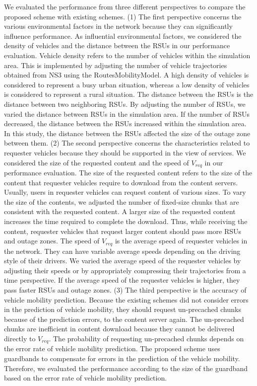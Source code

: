 \documentclass[electronics,aricle,accept,pdftex,moreauthors]{Definitions/mdpi}
\begin{document}
We evaluated the performance from three different perspectives to compare the proposed scheme with existing schemes. (1) The first perspective concerns the various environmental factors in the network because they can significantly influence performance. As influential environmental factors, we considered the density of vehicles and the distance between the RSUs in our performance evaluation. Vehicle density refers to the number of vehicles within the simulation area. This is implemented by adjusting the number of vehicle trajectories obtained from NS3 using the RoutesMobilityModel. A high density of vehicles is considered to represent a busy urban situation, whereas a low density of vehicles is considered to represent a rural situation. The distance between the RSUs is the distance between two neighboring RSUs. By adjusting the number of RSUs, we varied the distance between RSUs in the simulation area. If the number of RSUs decreased, the distance between the RSUs increased within the simulation area. In this study, the distance between the RSUs affected the size of the outage zone between them. (2) The second perspective concerns the characteristics related to requester vehicles because they should be supported in the view of services. We considered the size of the requested content and the speed of ${V}_{req}$ in our performance evaluation. The size of the requested content refers to the size of the content that requester vehicles require to download from the content servers. Usually, users in requester vehicles can request content of various sizes. To vary the size of the contents, we adjusted the number of fixed-size chunks that are consistent with the requested content. A larger size of the requested content increases the time required to complete the download. Thus, while receiving the content, requester vehicles that request larger content should pass more RSUs and outage zones. The speed of ${V}_{req}$ is the average speed of requester vehicles in the network. They can have variable average speeds depending on the driving style of their drivers. We varied the average speed of the requester vehicles by adjusting their speeds or by appropriately compressing their trajectories from a time perspective. If the average speed of the requester vehicles is higher, they pass faster RSUs and outage zones. (3) The third perspective is the accuracy of vehicle mobility prediction. Because the existing schemes did not consider errors in the prediction of vehicle mobility, they should request un-precached chunks because of the prediction errors, to the content server again. The un-precached chunks are inefficient in content download because they cannot be delivered directly to ${V}_{req}$. The probability of requesting un-precached chunks depends on the error rate of vehicle mobility prediction. The proposed scheme uses guardbands to compensate for errors in the prediction of the vehicle mobility. Therefore, we evaluated the performance according to the size of the guardband based on the error rate of vehicle mobility prediction.
\end{document}
